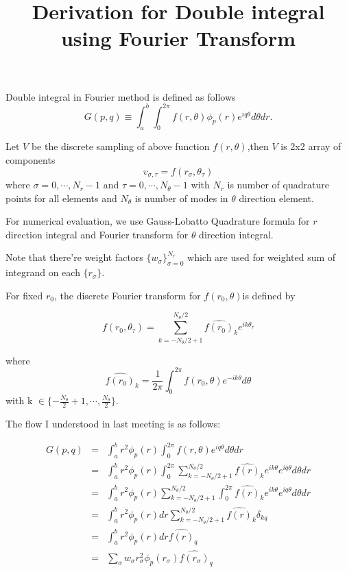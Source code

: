 \documentclass[11pt,letterpaper]{article}
\begin{document}
\title{{\bfseries Derivation for Double integral using Fourier Transform}
}

Double integral in Fourier method is defined as follows
\begin{equation}
G(p,q) \equiv \int_a^b \int_0^{2\pi} f(r, \theta)\phi_p(r) e^{iq\theta} d\theta dr.
\end{equation}

Let $V$ be the discrete sampling of above function $f(r, \theta)$,then $V$ is 2x2 array of components
\begin{equation}
v_{\sigma,\tau} = f(r_\sigma, \theta_\tau)
\end{equation}
where $\sigma = 0, \cdots, N_r-1$ and $\tau=0, \cdots, N_\theta-1$ with $N_r$ is number of quadrature points for all elements and $N_\theta$ is number of modes in $\theta$ direction element.

For numerical evaluation, we use Gauss-Lobatto Quadrature formula for $r$ direction integral and Fourier transform for $\theta$ direction integral.

Note that there're weight factors $\{w_\sigma\}_{\sigma =0}^{N_r}$ which are used for weighted sum of integrand on each $\{r_\sigma\}$.


For fixed $r_0$, the discrete Fourier transform for $f(r_0, \theta)$is defined by

\begin{equation}
f(r_0, \theta_\tau) = \sum_{k=-N_\theta/2+1}^{N_\theta/2} \widehat{f(r_0)}_k e^{ik\theta_\tau}
\end{equation}

where \begin{equation}
\widehat{f(r_0)}_k = \frac{1}{2\pi} \int_0^{2\pi} f(r_0, \theta) e^{-ik\theta} d\theta
\end{equation}
with k $\in \{-\frac{N_\theta}{2}+1, \cdots, \frac{N_\theta}{2}\}$.

The flow I understood in last meeting is as follows:

\begin{eqnarray}
G(p, q) &=& \int_a^b r^2\phi_p(r) \int_0^{2\pi} f(r,\theta) e^{iq\theta} d\theta dr \\
        &=& \int_a^b r^2\phi_p(r) \int_0^{2\pi} \sum_{k=-N_\theta/2+1}^{N_\theta/2} \widehat{f(r)}_k e^{ik\theta} e^{iq\theta} d\theta dr \\
        &=& \int_a^b r^2\phi_p(r) \sum_{k=-N_\theta/2+1}^{N_\theta/2}  \int_0^{2\pi}  \widehat{f(r)}_k e^{ik\theta} e^{iq\theta} d\theta dr \\
        &=& \int_a^b r^2\phi_p(r) dr \sum_{k=-N_\theta/2+1}^{N_\theta/2}  \widehat{f(r)}_k \delta_{kq} \\
        &=& \int_a^b r^2\phi_p(r) dr \widehat{f(r)}_q \\
        &=& \sum_\sigma w_\sigma r_\sigma^2\phi_p(r_\sigma) \widehat{f(r_\sigma)}_q
\end{eqnarray}
\end{document}
